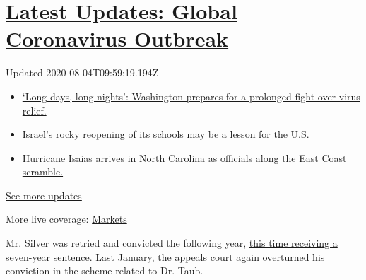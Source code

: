 \hypertarget{latest-updates-global-coronavirus-outbreak}{%
\section{\texorpdfstring{\href{https://www.nytimes.com/2020/08/04/world/coronavirus-covid-19.html?action=click\&pgtype=Article\&state=default\&region=MAIN_CONTENT_1\&context=storylines_live_updates}{Latest
Updates: Global Coronavirus
Outbreak}}{Latest Updates: Global Coronavirus Outbreak}}\label{latest-updates-global-coronavirus-outbreak}}

Updated 2020-08-04T09:59:19.194Z

\begin{itemize}
\tightlist
\item
  \href{https://www.nytimes.com/2020/08/04/world/coronavirus-covid-19.html?action=click\&pgtype=Article\&state=default\&region=MAIN_CONTENT_1\&context=storylines_live_updates\#link-6b644638}{`Long
  days, long nights': Washington prepares for a prolonged fight over
  virus relief.}
\item
  \href{https://www.nytimes.com/2020/08/04/world/coronavirus-covid-19.html?action=click\&pgtype=Article\&state=default\&region=MAIN_CONTENT_1\&context=storylines_live_updates\#link-7af9fca0}{Israel's
  rocky reopening of its schools may be a lesson for the U.S.}
\item
  \href{https://www.nytimes.com/2020/08/04/world/coronavirus-covid-19.html?action=click\&pgtype=Article\&state=default\&region=MAIN_CONTENT_1\&context=storylines_live_updates\#link-33bf9168}{Hurricane
  Isaias arrives in North Carolina as officials along the East Coast
  scramble.}
\end{itemize}

\href{https://www.nytimes.com/2020/08/04/world/coronavirus-covid-19.html?action=click\&pgtype=Article\&state=default\&region=MAIN_CONTENT_1\&context=storylines_live_updates}{See
more updates}

More live coverage:
\href{https://www.nytimes.com/live/2020/08/03/business/stock-market-today-coronavirus?action=click\&pgtype=Article\&state=default\&region=MAIN_CONTENT_1\&context=storylines_live_updates}{Markets}

Mr. Silver was retried and convicted the following year,
\href{https://www.nytimes.com/2018/07/27/nyregion/sheldon-silver-sentencing-prison-corruption.html}{this
time receiving a seven-year sentence}. Last January, the appeals court
again overturned his conviction in the scheme related to Dr. Taub.

